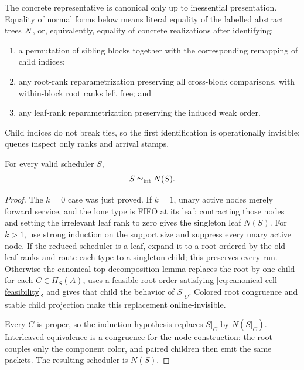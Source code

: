 The concrete representative is canonical only up to inessential
presentation.  Equality of normal forms below means literal equality of the
labelled abstract trees \(\mathcal N\), or, equivalently, equality of concrete
realizations after identifying:
\begin{enumerate}
\item a permutation of sibling blocks together with the corresponding
      remapping of child indices;
\item any root-rank reparametrization preserving all cross-block comparisons,
      with within-block root ranks left free; and
\item any leaf-rank reparametrization preserving the induced weak order.
\end{enumerate}
Child indices do not break ties, so the first identification is operationally
invisible; queues inspect only ranks and arrival stamps.

\begin{theorem}
\label{thm:canonical-normalization}
For every valid scheduler \(S\),
\begin{equation}
  S\mathrel{\simeq_{\mathrm{int}}} N(S).
  \label{eq:canonical-normalization}
\end{equation}
\end{theorem}

\begin{proof}
The \(k=0\) case was just proved.  If \(k=1\), unary active nodes merely
forward service, and the lone type is FIFO at its leaf; contracting those
nodes and setting the irrelevant leaf rank to zero gives the singleton leaf
\(N(S)\).  For \(k>1\), use strong induction on the support size and suppress
every unary active node.  If the reduced scheduler is a leaf, expand it to a
root ordered by the old leaf ranks and route each type to a singleton child;
this preserves every run.  Otherwise the canonical top-decomposition lemma
replaces the root by one child for each
\(C\in\Pi_S(A)\), uses a feasible root order satisfying
\autoref{eq:canonical-cell-feasibility}, and gives that child the behavior of
\(S|_C\).  Colored root congruence and stable child projection make this
replacement online-invisible.

Every \(C\) is proper, so the induction hypothesis replaces \(S|_C\) by
\(N(S|_C)\).  Interleaved equivalence is a congruence for the node
construction: the root couples only the component color, and paired children
then emit the same packets.  The resulting scheduler is \(N(S)\).
\end{proof}

